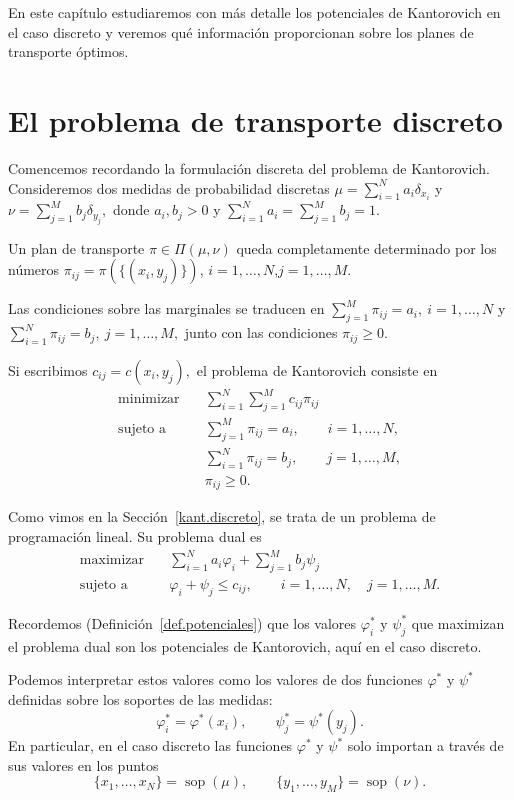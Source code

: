 \documentclass[12pt, a4paper]{amsbook}
\def\sop{\operatorname {\mathrm{sop}}}
\theoremstyle{remark}
\theoremstyle{definition}
\numberwithin{section}{chapter}
\numberwithin{subsection}{section}
\numberwithin{equation}{section}
\numberwithin{figure}{chapter}
\begin{document}
En este capítulo estudiaremos con más detalle los potenciales de Kantorovich en el caso discreto y veremos qué información proporcionan sobre los planes de transporte óptimos.


\section{El problema de transporte discreto}
Comencemos recordando la formulación discreta del problema de Kantorovich. Consideremos dos medidas de probabilidad discretas
\(
\mu=\sum_{i=1}^N a_i\delta_{x_i}\) y \(
\nu=\sum_{j=1}^M b_j\delta_{y_j},
\)
donde $a_i,b_j>0$ y
\(
\sum_{i=1}^N a_i
=
\sum_{j=1}^M b_j
=1.
\)

Un plan de transporte $\pi\in\Pi(\mu,\nu)$ queda completamente determinado
por los números
\(
\pi_{ij}=\pi(\{(x_i,y_j)\})\),
\(i=1,\ldots,N\),\(j=1,\ldots,M.\)

Las condiciones sobre las marginales se traducen en
\(
\sum_{j=1}^M\pi_{ij}=a_i,
\ i=1,\ldots,N\) y
\(\sum_{i=1}^N\pi_{ij}=b_j,
\ j=1,\ldots,M,
\)
junto con las condiciones
\(
\pi_{ij}\geq0.
\)

Si escribimos
\(
c_{ij}=c(x_i,y_j),
\)
el problema de Kantorovich consiste en
\[
\begin{aligned}
\text{minimizar}\quad&
\sum_{i=1}^N\sum_{j=1}^M c_{ij}\pi_{ij}\\
\text{sujeto a}\quad&
\sum_{j=1}^M\pi_{ij}=a_i,
\qquad i=1,\ldots,N,\\
&
\sum_{i=1}^N\pi_{ij}=b_j,
\qquad j=1,\ldots,M,\\
&
\pi_{ij}\geq0.
\end{aligned}
\]

Como vimos en la Sección~\ref{kant.discreto}, se trata de un problema de programación lineal.
Su problema dual es
\[
\begin{aligned}
\text{maximizar}\quad&
\sum_{i=1}^N a_i\varphi_i
+
\sum_{j=1}^M b_j\psi_j\\
\text{sujeto a}\quad&
\varphi_i+\psi_j\leq c_{ij},
\qquad
i=1,\ldots,N,\quad j=1,\ldots,M.
\end{aligned}
\]

Recordemos (Definición~\ref{def.potenciales}) que los valores
$\varphi_i^*$ y $\psi_j^*$ que maximizan el problema dual son los
potenciales de Kantorovich, aquí en el caso discreto.

Podemos interpretar estos valores como los valores de dos funciones
$\varphi^*$ y $\psi^*$ definidas sobre los soportes de las medidas:
\[
\varphi_i^*=\varphi^*(x_i),
\qquad
\psi_j^*=\psi^*(y_j).
\]
En particular, en el caso discreto las funciones $\varphi^*$ y $\psi^*$
solo importan a través de sus valores en los puntos
\[
\{x_1,\ldots,x_N\}=\sop(\mu),
\qquad
\{y_1,\ldots,y_M\}=\sop(\nu).
\]
\end{document}
